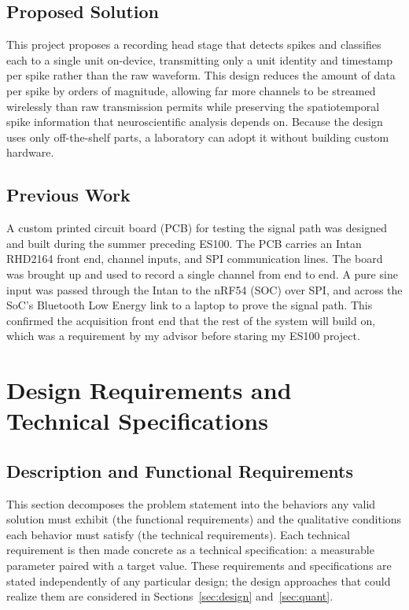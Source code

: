 \documentclass[11pt]{article}
\begin{document}
\subsection{Proposed Solution}
This project proposes a recording head stage that detects spikes and classifies each to a
single unit on-device, transmitting only a unit identity and timestamp per spike
rather than the raw waveform. This design reduces the amount of data per spike by orders
of magnitude, allowing far more channels to be streamed wirelessly than raw transmission
permits while preserving the spatiotemporal spike information that neuroscientific analysis
depends on. Because the design uses only off-the-shelf parts, a laboratory can adopt it
without building custom hardware.

\subsection{Previous Work}
A custom printed circuit board (PCB) for testing the signal path was designed and built during the summer preceding ES100.
The PCB carries an Intan RHD2164 front end, channel inputs, and SPI communication lines. The board was brought up and used 
to record a single channel from end to end. A pure sine input was passed through the Intan to the nRF54 (SOC) over SPI, 
and across the SoC's Bluetooth Low Energy link to a laptop to prove the signal path. This confirmed the acquisition front 
end that the rest of the system will build on, which was a requirement by my advisor before staring my ES100 project. 

\section{Design Requirements and Technical Specifications}

\subsection{Description and Functional Requirements}
This section decomposes the problem statement into the behaviors any valid solution must
exhibit (the functional requirements) and the qualitative conditions each behavior must
satisfy (the technical requirements). Each technical requirement is then made concrete as
a technical specification: a measurable parameter paired with a target value. These
requirements and specifications are stated independently of any particular design; the
design approaches that could realize them are considered in Sections~\ref{sec:design} and~\ref{sec:quant}.
\end{document}
